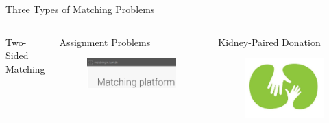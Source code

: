 \documentclass{beamer}
\begin{document}
\begin{frame}{Three Types of Matching Problems}
	\begin{columns}[t]
		\begin{block}{Two-Sided Matching}
		\end{block}
		\pause
		\begin{block}{Assignment Problems }
			\begin{figure}
				\includegraphics[width=\linewidth]{tum_matching_small.png}
			\end{figure} 
		\end{block}
		\pause
		\begin{block}{Kidney-Paired Donation}
			\begin{figure}
				\includegraphics[width=\linewidth]{kidney_donation.jpg}
			\end{figure}
		\end{block}
		\end{columns} 
\end{frame}
\end{document}
